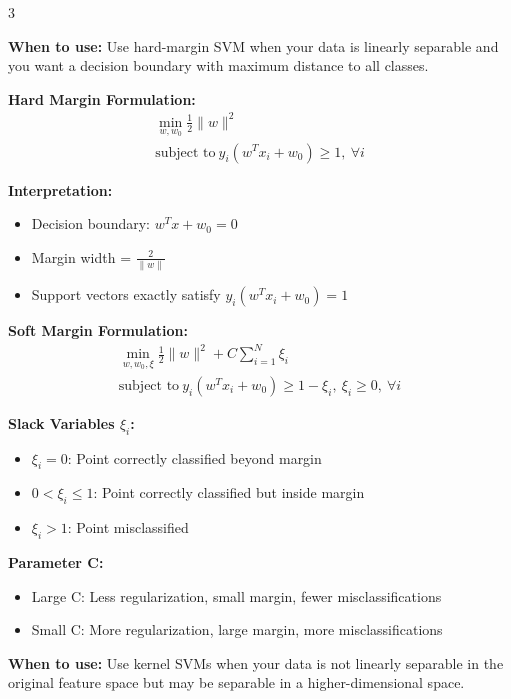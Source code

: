 \documentclass[10pt,landscape]{article}
\begin{document}
\begin{multicols}{3}
\begin{tcolorbox}[breakable, title=4.1 Maximum Margin Classification, colback=svm,boxsep=1pt,left=1pt,right=1pt,top=1pt,bottom=1pt]
\textbf{When to use:} Use hard-margin SVM when your data is linearly separable and you want a decision boundary with maximum distance to all classes.

\textbf{Hard Margin Formulation:}
\begin{align}
\min_{w,w_0} \frac{1}{2}\|w\|^2 \\
\text{subject to}~y_i(w^Tx_i + w_0) \geq 1,~\forall i
\end{align}

\textbf{Interpretation:}
\begin{itemize}[leftmargin=*,noitemsep,topsep=0pt]
    \item Decision boundary: $w^Tx + w_0 = 0$
    \item Margin width = $\frac{2}{\|w\|}$
    \item Support vectors exactly satisfy $y_i(w^Tx_i + w_0) = 1$
\end{itemize}

\textbf{Soft Margin Formulation:}
\begin{align}
\min_{w,w_0,\xi} \frac{1}{2}\|w\|^2 + C\sum_{i=1}^N \xi_i \\
\text{subject to}~y_i(w^Tx_i + w_0) \geq 1 - \xi_i,~\xi_i \geq 0,~\forall i
\end{align}

\textbf{Slack Variables $\xi_i$:}
\begin{itemize}[leftmargin=*,noitemsep,topsep=0pt]
    \item $\xi_i = 0$: Point correctly classified beyond margin
    \item $0 < \xi_i \leq 1$: Point correctly classified but inside margin
    \item $\xi_i > 1$: Point misclassified
\end{itemize}

\textbf{Parameter C:}
\begin{itemize}[leftmargin=*,noitemsep,topsep=0pt]
    \item Large C: Less regularization, small margin, fewer misclassifications
    \item Small C: More regularization, large margin, more misclassifications
\end{itemize}
\end{tcolorbox}

\begin{tcolorbox}[breakable, title=4.2 The Kernel Trick, colback=svm,boxsep=1pt,left=1pt,right=1pt,top=1pt,bottom=1pt]
\textbf{When to use:} Use kernel SVMs when your data is not linearly separable in the original feature space but may be separable in a higher-dimensional space.


\end{tcolorbox}
\end{multicols}
\end{document}
